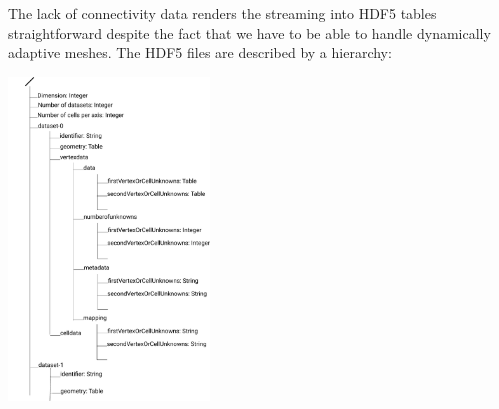The lack of connectivity data renders the streaming into HDF5 tables
straightforward despite the fact that we have to be able to handle dynamically
adaptive meshes.
The HDF5 files are described by a hierarchy:

\begin{center} 
 \includegraphics[width=0.4\textwidth]{81_blockstructured-file-format/hierarchy.pdf}
\end{center}

